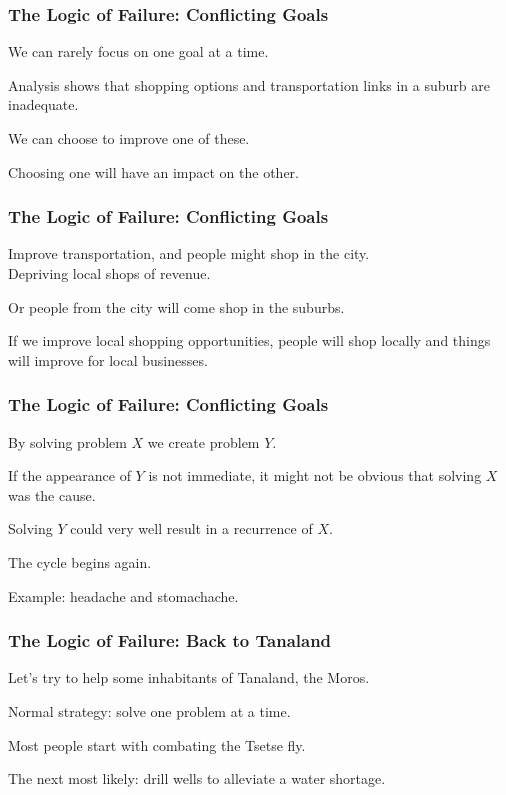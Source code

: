\begin{frame}
\frametitle{The Logic of Failure: Conflicting Goals}
\begin{changemargin}{1cm}
We can rarely focus on one goal at a time.

Analysis shows that shopping options and transportation links in a suburb are inadequate.

We can choose to improve one of these.

Choosing one will have an impact on the other.

\end{changemargin}
\end{frame}

\begin{frame}
\frametitle{The Logic of Failure: Conflicting Goals}
\begin{changemargin}{1cm}
Improve transportation, and people might shop in the city. \\
\quad Depriving local shops of revenue.


Or people from the city will come shop in the suburbs.

If we improve local shopping opportunities, people will shop locally and things will improve for local businesses. 

\end{changemargin}
\end{frame}

\begin{frame}
\frametitle{The Logic of Failure: Conflicting Goals}
\begin{changemargin}{1cm}
By solving problem $X$ we create problem $Y$. 

If the appearance of $Y$ is not immediate, it might not be obvious that solving $X$ was the cause. 

Solving $Y$ could very well result in a recurrence of $X$. 

The cycle begins again.

Example: headache and stomachache.

\end{changemargin}
\end{frame}

\begin{frame}
\frametitle{The Logic of Failure: Back to Tanaland}
\begin{changemargin}{1cm}
Let's try to help some inhabitants of Tanaland, the Moros. 

Normal strategy: solve one problem at a time.  

Most people start with combating the Tsetse fly.

The next most likely: drill wells to alleviate a water shortage.
\end{changemargin}
\end{frame}

